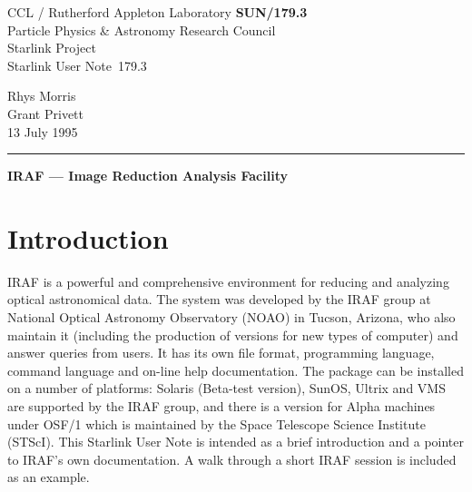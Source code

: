 \pagestyle{myheadings}

\newcommand{\stardoccategory}  {Starlink User Note}
\newcommand{\stardocinitials}  {SUN}
\newcommand{\stardocnumber}    {179.3}
\newcommand{\stardocauthors}   {Rhys Morris \\ Grant Privett}
\newcommand{\stardocdate}      {13 July 1995}
\newcommand{\stardoctitle}     {IRAF --- Image Reduction Analysis Facility}

\newcommand{\stardocname}{\stardocinitials /\stardocnumber}
\markright{\stardocname}
\setlength{\textwidth}{160mm}
\setlength{\textheight}{230mm}
\setlength{\topmargin}{-2mm}
\setlength{\oddsidemargin}{0mm}
\setlength{\evensidemargin}{0mm}
\setlength{\parindent}{0mm}
\setlength{\parskip}{\medskipamount}
\setlength{\unitlength}{1mm}


\thispagestyle{empty}
CCL / {\sc Rutherford Appleton Laboratory} \hfill {\bf \stardocname}\\
{\large Particle Physics \& Astronomy Research Council}\\
{\large Starlink Project\\}
{\large \stardoccategory\ \stardocnumber}
\begin{flushright}
\stardocauthors\\
\stardocdate
\end{flushright}
\vspace{-4mm}
\rule{\textwidth}{0.5mm}
\vspace{5mm}
\begin{center}
{\Large\bf \stardoctitle}
\end{center}
\vspace{5mm}

\setlength{\parskip}{0mm}
\tableofcontents
\setlength{\parskip}{\medskipamount}
\markright{\stardocname}

\newpage
\section{Introduction} 

IRAF is a powerful and comprehensive environment for reducing and
analyzing optical astronomical data.  The system was developed by the
IRAF group at National Optical Astronomy Observatory (NOAO) in Tucson,
Arizona, who also maintain it (including the production of versions for
new types of computer) and answer queries from users. It has its own
file format, programming language, command language and on-line help
documentation.  The package can be installed on a number of platforms:
Solaris (Beta-test version), SunOS, Ultrix and VMS are supported by the
IRAF group, and there is a version for Alpha machines under OSF/1 which
is maintained by the Space Telescope Science Institute (STScI). This
Starlink User Note is intended as a brief introduction and a pointer to
IRAF's own documentation.  A walk through a short IRAF session is
included as an example.

